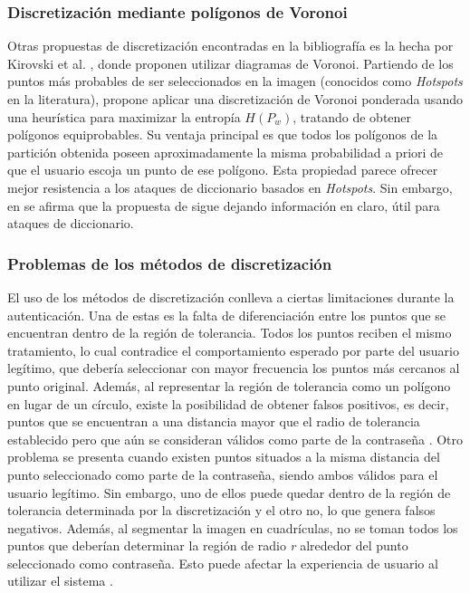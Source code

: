 \subsubsection{Discretización mediante polígonos de Voronoi}
Otras propuestas de discretización encontradas en la bibliografía es la hecha por Kirovski et al. \cite{kirovski2007click}, donde proponen utilizar diagramas de Voronoi. Partiendo de los puntos más probables de ser seleccionados en la imagen (conocidos como \textit{Hotspots} en la literatura), propone aplicar una discretización de Voronoi ponderada usando una heurística para maximizar la entropía \(H(P_w)\), tratando de obtener polígonos equiprobables. Su ventaja principal es que todos los polígonos de la partición obtenida poseen aproximadamente la misma probabilidad a priori de que el usuario escoja un punto de ese polígono. Esta propiedad parece ofrecer mejor resistencia a los ataques de diccionario basados en \textit{Hotspots}. Sin embargo, en \cite{zhu2013securityl} se afirma que la propuesta de \cite{kirovski2007click} sigue dejando información en claro, útil para ataques de diccionario.

\subsubsection{Problemas de los métodos de discretización}
	
El uso de los métodos de discretización conlleva a ciertas limitaciones durante la autenticación. Una de estas es la falta de diferenciación entre los puntos que se encuentran dentro de la región de tolerancia. Todos los puntos reciben el mismo tratamiento, lo cual contradice el comportamiento esperado por parte del usuario legítimo, que debería seleccionar con mayor frecuencia los puntos más cercanos al punto original. Además, al representar la región de tolerancia como un polígono en lugar de un círculo, existe la posibilidad de obtener falsos positivos, es decir, puntos que se encuentran a una distancia mayor que el radio de tolerancia establecido pero que aún se consideran válidos como parte de la contraseña \cite{blonder1996graphical, borrego2018debilidades}. Otro problema se presenta cuando existen puntos situados a la misma distancia del punto seleccionado como parte de la contraseña, siendo ambos válidos para el usuario legítimo. Sin embargo, uno de ellos puede quedar dentro de la región de tolerancia determinada por la discretización y el otro no, lo que genera falsos negativos. Además, al segmentar la imagen en cuadrículas, no se toman todos los puntos que deberían determinar la región de radio \textit{r} alrededor del punto seleccionado como contraseña. Esto puede afectar la experiencia de usuario al utilizar el sistema \cite{bicakci2008optimal, borrego2018debilidades}.

